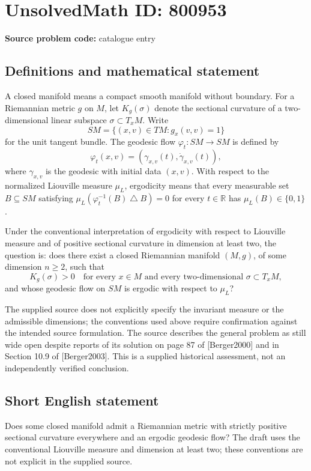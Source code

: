 \documentclass[11pt]{article}
\newcommand{\R}{\mathbb{R}}
\begin{document}
\section*{UnsolvedMath ID: 800953}
\textbf{Source problem code:} catalogue entry
\subsection{Definitions and mathematical statement}
A closed manifold means a compact smooth manifold without boundary. For a Riemannian metric \(g\) on \(M\), let \(K_g(\sigma)\) denote the sectional curvature of a two-dimensional linear subspace \(\sigma\subset T_xM\). Write
\[
SM=\{(x,v)\in TM:g_x(v,v)=1\}
\]
for the unit tangent bundle. The geodesic flow \(\varphi_t:SM\to SM\) is defined by
\[
\varphi_t(x,v)=(\gamma_{x,v}(t),\dot\gamma_{x,v}(t)),
\]
where \(\gamma_{x,v}\) is the geodesic with initial data \((x,v)\). With respect to the normalized Liouville measure \(\mu_L\), ergodicity means that every measurable set \(B\subseteq SM\) satisfying \(\mu_L(\varphi_t^{-1}(B)\mathbin{\triangle}B)=0\) for every \(t\in\R\) has \(\mu_L(B)\in\{0,1\}\).

Under the conventional interpretation of ergodicity with respect to Liouville measure and of positive sectional curvature in dimension at least two, the question is: does there exist a closed Riemannian manifold \((M,g)\), of some dimension \(n\geq2\), such that
\[
K_g(\sigma)>0
\quad\text{for every }x\in M\text{ and every two-dimensional }\sigma\subset T_xM,
\]
and whose geodesic flow on \(SM\) is ergodic with respect to \(\mu_L\)?

The supplied source does not explicitly specify the invariant measure or the admissible dimensions; the conventions used above require confirmation against the intended source formulation. The source describes the general problem as still wide open despite reports of its solution on page 87 of [Berger2000] and in Section 10.9 of [Berger2003]. This is a supplied historical assessment, not an independently verified conclusion.
\subsection{Short English statement}
Does some closed manifold admit a Riemannian metric with strictly positive sectional curvature everywhere and an ergodic geodesic flow? The draft uses the conventional Liouville measure and dimension at least two; these conventions are not explicit in the supplied source.
\end{document}
